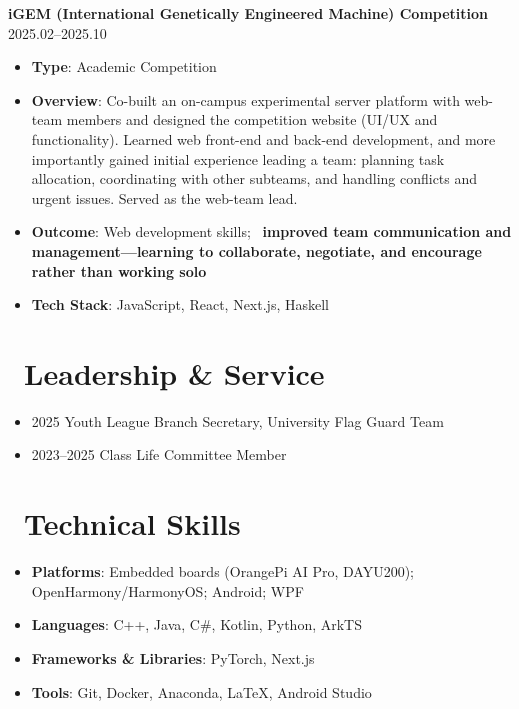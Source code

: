 \documentclass[11pt]{article}
\begin{document}
\vspace*{0.1em}

\textbf{\large \color{CVBlue} iGEM (International Genetically Engineered Machine) Competition} \hfill 2025.02--2025.10
\begin{itemize}
    \item \textbf{Type}: Academic Competition
    \item \textbf{Overview}: Co-built an on-campus experimental server platform with web-team members and designed the competition website (UI/UX and functionality).
    Learned web front-end and back-end development, and more importantly gained initial experience leading a team: planning task allocation, coordinating with other subteams, and handling conflicts and urgent issues.
    Served as the web-team lead.
    \item[\textcolor{CVBlue}{\faStar}] \textbf{\textcolor{CVBlue}{Outcome}}: Web development skills; \ \textbf{improved team communication and management—learning to collaborate, negotiate, and encourage rather than working solo}
    \item \textbf{Tech Stack}: JavaScript, React, Next.js, Haskell
\end{itemize}

\vspace*{0.7em}

\section{\makebox[\widthof{\faGraduationCap}][c]{\color{CVBlue}\faUsers}\ Leadership \& Service}
\begin{itemize}
	\item 2025 \quad Youth League Branch Secretary, University Flag Guard Team
	\item 2023--2025 \quad Class Life Committee Member
\end{itemize}

\vspace*{0.7em}

\section{\makebox[\widthof{\faGraduationCap}][c]{\color{CVBlue}\faWrench}\ Technical Skills}

\begin{itemize}
    \item \textbf{Platforms}: Embedded boards (OrangePi AI Pro, DAYU200); OpenHarmony/HarmonyOS; Android; WPF 
    \item \textbf{Languages}: C++, Java, C\#, Kotlin, Python, ArkTS
    \item \textbf{Frameworks \& Libraries}: PyTorch, Next.js
    \item \textbf{Tools}: Git, Docker, Anaconda, \LaTeX{}, Android Studio
\end{itemize}


\end{document}
